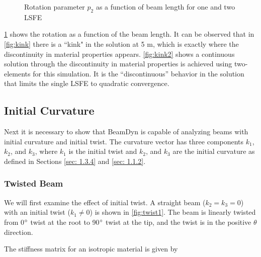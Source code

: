 \documentclass[letterpaper,12pt]{article}
\begin{document}
\begin{figure}
	\begin{center}
		\caption{\label{fig:kinks}Rotation parameter $p_2$ as a function of beam length for one and two LSFE}
	\end{center}
\end{figure}

\ref{fig:kinks} shows the rotation as a function of the beam length. It can be observed that in \ref{fig:kink} there is a ``kink" in the solution at 5 m, which is exactly where the discontinuity in material properties appears. \ref{fig:kink2} shows a continuous solution through the discontinuity in material properties is achieved using two-elements for this simulation. It is the ``discontinuous'' behavior in the solution that limits the single LSFE to quadratic convergence.
\newpage
\subsection{Initial Curvature}
Next it is necessary to show that BeamDyn is capable of analyzing beams with initial curvature and initial twist. The curvature vector has three components $k_1$, $k_2$, and $k_3$, where $k_1$ is the initial twist and $k_2$, and $k_3$ are the initial curvature as defined in Sections \ref{sec: 1.3.4} and \ref{sec: 1.1.2}.

\subsubsection{Twisted Beam}
\label{sec: tb}
We will first examine the effect of initial twist. A straight beam ($k_2=k_3=0$) with an initial twist ($k_1\neq 0$) is shown in \ref{fig:twist1}. The beam is linearly twisted from 0$\degree$ twist at the root to 90$\degree$ twist at the tip, and the twist is in the positive $\theta$ direction.

The stiffness matrix for an isotropic material is given by
\end{document}
